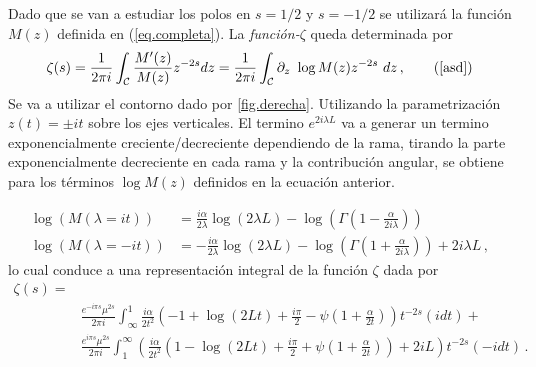 Dado que se van a estudiar los polos en $s=1/2$ y $s=-1/2$ se utilizará la función $M (z)$ definida en (\ref{eq.completa}).
La {\it función-$ \zeta$} queda determinada por
\begin{equation}
\zeta (s) = 
\frac{1}{2 \pi i} 
\int _{\mathcal{C}}
\frac{M ' ( z ) }{ M ( z ) } z ^{-2s} d z = 
\frac{1}{2 \pi i} 
\int _{\mathcal{C}}
\partial _z \ \log 	M(z)  z ^{-2s} \ dz
	\, ,
	\tag{\ref{asd}}
\end{equation}
Se va a utilizar el contorno dado por \ref{fig.derecha}. 
Utilizando la parametrización $ z (t) = \pm i t$ sobre los ejes verticales. El termino $e ^{2 i \lambda L}$ va a generar un termino exponencialmente creciente/decreciente dependiendo de la rama, tirando la parte exponencialmente decreciente en cada rama y la contribución angular, se obtiene para los términos $\log M(z)$ definidos en la ecuación anterior.
\begin{comment}
\begin{equation}
\begin{array}{c}
    \zeta  (s) = \\
     \frac{1}{2 \pi i} \int _{\infty} ^{1}
     \frac{ i \alpha }{2 t^2} 
     \left(
      1 + \frac{i \pi}{2} + Ln[2 t] + \psi (1 + \frac{\beta}{2 t})
     \right)
     t ^{-2s}
     e ^{- i \pi s} (i dt) + \\
     \frac{1}{2 \pi i} \int _{\infty} ^{1} 
     \left(
     2 + \frac{\beta}{2 t^2}
     \left(
     1 + \frac{i \pi}{2} - Ln[2 t] - \psi (1+ \frac{\beta}{2 t})
     \right)
     t ^{-2s}
     e ^{ i \pi s} (-i dt)
     \right)     
\end{array}
\end{equation}
\end{comment}
\begin{align}\label{eq.logatirmos}
\log ( M ( \lambda = i t ) ) &=   
\frac{i \alpha }{2 \lambda}  \log (2 \lambda L) - 
 \log \left( \Gamma \left( 1 - \frac{ \alpha}{2 i \lambda} \right) \right) \\ 
\log ( M ( \lambda=-i t ) ) &=   -  
\frac{i \alpha }{2 \lambda}  \log ( 2 \lambda L ) - 
 \log \left( \Gamma \left( 1 + \frac{ \alpha}{2 i \lambda} \right) \right) +
2 i \lambda L  \nonumber
	\,	,
\end{align}
lo cual conduce a una representación integral de la función $\zeta$ dada por
\begin{align}\label{eq.zeta.logs}
    \zeta  (s) =& \\
     & \frac{e^{-i \pi s} \mu ^{2s}}{2 \pi i} \int _{\infty} ^{1}
     \frac{ i \alpha}{2 t^2}
     \left(
     - 1 +  \log (2 L t) + \frac{i \pi}{2}  - \psi \left( 1+\frac{\alpha}{2 t} \right)
     \right)
     t^{-2 s}
      \nonumber
     (i dt) + \\
     & \frac{e^{i \pi s} \mu ^{2s}}{2 \pi i} \int _1 ^{\infty}
	\left(      
     \frac{ i \alpha}{2  t^2}
     \left(
     1 -  \log (2 L t) + \frac{i \pi}{2} + \psi \left( 1 + \frac{\alpha}{2 t} \right)       
     \right)
     + 2 i L
     \right)
     t^{-2 s}
     (-i dt) \nonumber
     	\, .
\end{align}
